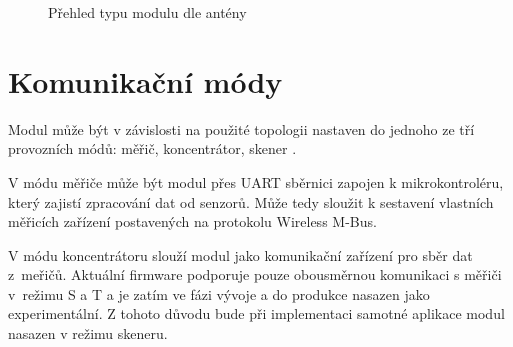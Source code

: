\begin{figure}[!ht]
    \centering
			\hspace*{5mm}
			\hspace*{5mm}
		\caption{Přehled typu modulu dle antény \cite{ModulIQRF}}
		\label{ObrazekAnteny}
		\vspace{-20pt}
\end{figure}

\section{Komunikační módy}

Modul může být v závislosti na použité topologii nastaven do jednoho ze tří provozních módů: měřič, koncentrátor, skener \cite{ModulIQRF}. 

V módu měřiče může být modul přes UART sběrnici zapojen k mikrokontroléru, který zajistí zpracování dat od senzorů. Může tedy sloužit k sestavení vlastních měřicích zařízení postavených na protokolu Wireless M-Bus.

V módu koncentrátoru slouží modul jako komunikační zařízení pro sběr dat z~meřičů. Aktuální firmware podporuje pouze obousměrnou komunikaci s měřiči v~režimu S a T a je zatím ve fázi vývoje a do produkce nasazen jako experimentální. Z tohoto důvodu bude při implementaci samotné aplikace modul nasazen v režimu skeneru.

